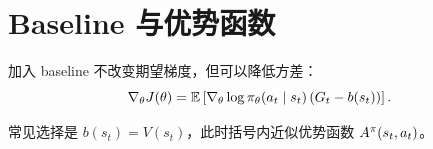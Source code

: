 \section{Baseline 与优势函数}

加入 baseline 不改变期望梯度，但可以降低方差：
\[
  \nabla_{\theta}J(\theta)
  =
  \mathbb{E}\left[
    \nabla_{\theta}\log\pi_{\theta}(a_t\mid s_t)
    \left(G_t-b(s_t)\right)
  \right].
\]

常见选择是 $b(s_t)=V(s_t)$，此时括号内近似优势函数 $A^{\pi}(s_t,a_t)$。
